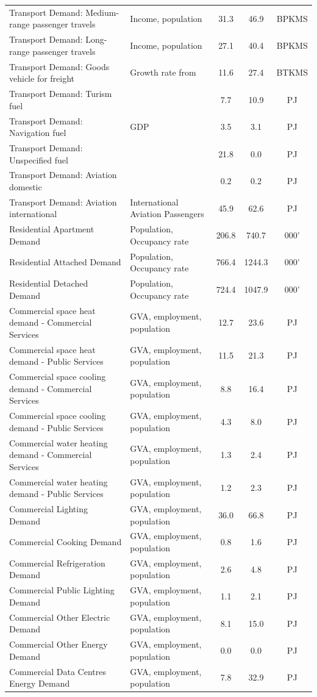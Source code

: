 \documentclass[journal abbreviation, manuscript]{copernicus}
\begin{document}
\begin{table}[htbp]
{\begin{tabular}{p{18em}lccc}
 Transport Demand: Medium-range passenger travels & Income, population & 31.3 & 46.9 & BPKMS \\
 Transport Demand: Long-range passenger travels & Income, population & 27.1 & 40.4 & BPKMS \\
 Transport Demand: Goods vehicle for freight & Growth rate from \citep{yan2020freight} & 11.6 & 27.4 & BTKMS \\
 Transport Demand: Turism fuel & & 7.7 & 10.9 & PJ \\
 Transport Demand: Navigation fuel & GDP & 3.5 & 3.1 & PJ \\
 Transport Demand: Unspecified fuel & & 21.8 & 0.0 & PJ \\
 Transport Demand: Aviation domestic & & 0.2 & 0.2 & PJ \\
 Transport Demand: Aviation international & International Aviation Passengers & 45.9 & 62.6 & PJ \\
 Residential Apartment Demand & Population, Occupancy rate & 206.8 & 740.7 & 000' \\
 Residential Attached Demand & Population, Occupancy rate & 766.4 & 1244.3 & 000' \\
 Residential Detached Demand & Population, Occupancy rate & 724.4 & 1047.9 & 000' \\
 Commercial space heat demand - Commercial Services & GVA, employment, population & 12.7 & 23.6 & PJ \\
 Commercial space heat demand - Public Services & GVA, employment, population & 11.5 & 21.3 & PJ \\
 Commercial space cooling demand - Commercial Services & GVA, employment, population & 8.8 & 16.4 & PJ \\
 Commercial space cooling demand - Public Services & GVA, employment, population & 4.3 & 8.0 & PJ \\
 Commercial water heating demand - Commercial Services & GVA, employment, population & 1.3 & 2.4 & PJ \\
 Commercial water heating demand - Public Services & GVA, employment, population & 1.2 & 2.3 & PJ \\
 Commercial Lighting Demand & GVA, employment, population & 36.0 & 66.8 & PJ \\
 Commercial Cooking Demand & GVA, employment, population & 0.8 & 1.6 & PJ \\
 Commercial Refrigeration Demand & GVA, employment, population & 2.6 & 4.8 & PJ \\
 Commercial Public Lighting Demand & GVA, employment, population & 1.1 & 2.1 & PJ \\
 Commercial Other Electric Demand & GVA, employment, population & 8.1 & 15.0 & PJ \\
 Commercial Other Energy Demand & GVA, employment, population & 0.0 & 0.0 & PJ \\
 Commercial Data Centres Energy Demand & GVA, employment, population & 7.8 & 32.9 & PJ \\ \hline
 \end{tabular}%
 }
 \label{tab:ESD_list}%
\end{table}%
\end{document}
